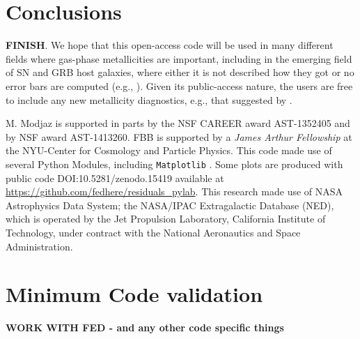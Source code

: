 \documentclass{emulateapj}
\begin{document}
\section{Conclusions}\label{comp_sec}

 \textbf{FINISH}. We hope that this open-access code will be used in many different fields where gas-phase metallicities are important, including in the emerging field of SN and GRB host galaxies, where either it is not described how they got  or no error bars are computed (e.g., \citealt{lunnan14}). Given its public-access nature, the users are free to include any new metallicity diagnostics, e.g., that suggested by \citet{dopita13}.

\acknowledgements
M. Modjaz is supported in parts by the NSF CAREER award AST-1352405 and by NSF award AST-1413260. FBB is supported by a \emph{James Arthur Fellowship} at the NYU-Center for Cosmology and Particle Physics. 
This code made use of  several Python Modules, including \verb=Matplotlib= \citep{hunter07}.
Some plots are  produced with public code DOI:10.5281/zenodo.15419 available at \url{https://github.com/fedhere/residuals_pylab}.
This research made use of NASA Astrophysics Data
System; the NASA/IPAC Extragalactic Database (NED), which
is operated by the Jet Propulsion Laboratory, California Institute
of Technology, under contract with the National Aeronautics
and Space Administration.








%

\appendix

\section{Minimum Code validation}
\textbf{WORK WITH FED - and any other code specific things}
\end{document}
